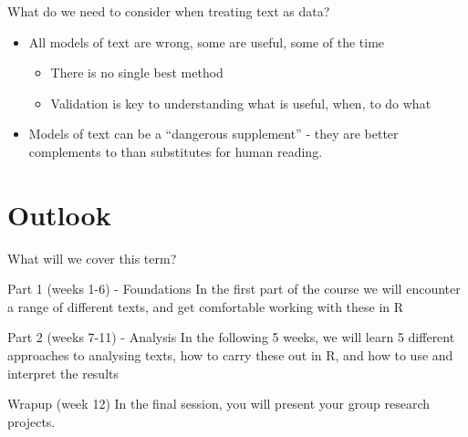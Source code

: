 \documentclass[
  10pt,
  ignorenonframetext,
  aspectratio=169]{beamer}
\begin{document}
\begin{frame}{What do we need to consider when treating text as data?}
\protect\hypertarget{what-do-we-need-to-consider-when-treating-text-as-data}{}
\label{CONSIDERATIONS}

\begin{itemize}
  \item<1-> All models of text are wrong, some are useful, some of the time 
  \begin{itemize}
    \item<2-> There is no single best method
    \item<3-> Validation is key to understanding what is useful, when, to do what
  \end{itemize}
  \item<4-> Models of text can be a ``dangerous supplement''  \hyperlink{PHARMAKON}{} - they are better complements to than substitutes for human reading.


\end{itemize}
\end{frame}

\hypertarget{outlook}{%
\section{Outlook}\label{outlook}}

\begin{frame}{What will we cover this term?}
\protect\hypertarget{what-will-we-cover-this-term}{}
\begin{block}{Part 1 (weeks 1-6) - Foundations}
\protect\hypertarget{part-1-weeks-1-6---foundations}{}
In the first part of the course we will encounter a range of different
texts, and get comfortable working with these in R
\end{block}

\begin{block}{Part 2 (weeks 7-11) - Analysis}
\protect\hypertarget{part-2-weeks-7-11---analysis}{}
In the following 5 weeks, we will learn 5 different approaches to
analysing texts, how to carry these out in R, and how to use and
interpret the results
\end{block}

\begin{block}{Wrapup (week 12)}
\protect\hypertarget{wrapup-week-12}{}
In the final session, you will present your group research projects.
\end{block}
\end{frame}
\end{document}
